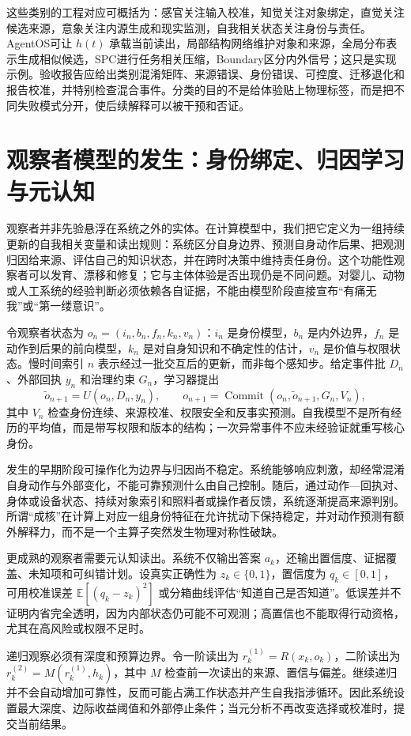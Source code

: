 这些类别的工程对应可概括为：感官关注输入校准，知觉关注对象绑定，直觉关注候选来源，意象关注内源生成和现实监测，自我相关状态关注身份与责任。AgentOS可让 $h(t)$ 承载当前读出，局部结构网络维护对象和来源，全局分布表示生成相似候选，SPC进行任务相关压缩，Boundary区分内外信号；这只是实现示例。验收报告应给出类别混淆矩阵、来源错误、身份错误、可控度、迁移退化和报告校准，并特别检查混合事件。分类的目的不是给体验贴上物理标签，而是把不同失败模式分开，使后续解释可以被干预和否证。

\section{观察者模型的发生：身份绑定、归因学习与元认知}
\label{sec:ontogenesis_of_observer}
观察者并非先验悬浮在系统之外的实体。在计算模型中，我们把它定义为一组持续更新的自我相关变量和读出规则：系统区分自身边界、预测自身动作后果、把观测归因给来源、评估自己的知识状态，并在跨时决策中维持责任身份。这个功能性观察者可以发育、漂移和修复；它与主体体验是否出现仍是不同问题。对婴儿、动物或人工系统的经验判断必须依赖各自证据，不能由模型阶段直接宣布“有痛无我”或“第一缕意识”。

令观察者状态为 $o_n=(i_n,b_n,f_n,k_n,v_n)$：$i_n$ 是身份模型，$b_n$ 是内外边界，$f_n$ 是动作到后果的前向模型，$k_n$ 是对自身知识和不确定性的估计，$v_n$ 是价值与权限状态。慢时间索引 $n$ 表示经过一批交互后的更新，而非每个感知步。给定事件批 $D_n$、外部回执 $y_n$ 和治理约束 $G_n$，学习器提出
\[
\tilde o_{n+1}=U(o_n,D_n,y_n),\qquad
o_{n+1}=\operatorname{Commit}(o_n,\tilde o_{n+1},G_n,V_n),
\]
其中 $V_n$ 检查身份连续、来源校准、权限安全和反事实预测。自我模型不是所有经历的平均值，而是带写权限和版本的结构；一次异常事件不应未经验证就重写核心身份。

发生的早期阶段可操作化为边界与归因尚不稳定。系统能够响应刺激，却经常混淆自身动作与外部变化，不能可靠预测什么由自己控制。随后，通过动作—回执对、身体或设备状态、持续对象索引和照料者或操作者反馈，系统逐渐提高来源判别。所谓“成核”在计算上对应一组身份特征在允许扰动下保持稳定，并对动作预测有额外解释力，而不是一个主算子突然发生物理对称性破缺。

更成熟的观察者需要元认知读出。系统不仅输出答案 $a_k$，还输出置信度、证据覆盖、未知项和可纠错计划。设真实正确性为 $z_k\in\{0,1\}$，置信度为 $q_k\in[0,1]$，可用校准误差 $\mathbb E[(q_k-z_k)^2]$ 或分箱曲线评估“知道自己是否知道”。低误差并不证明内省完全透明，因为内部状态仍可能不可观测；高置信也不能取得行动资格，尤其在高风险或权限不足时。

递归观察必须有深度和预算边界。令一阶读出为 $r_k^{(1)}=R(x_k,o_k)$，二阶读出为 $r_k^{(2)}=M(r_k^{(1)},h_k)$，其中 $M$ 检查前一次读出的来源、置信与偏差。继续递归并不会自动增加可靠性，反而可能占满工作状态并产生自我指涉循环。因此系统设置最大深度、边际收益阈值和外部停止条件；当元分析不再改变选择或校准时，提交当前结果。

